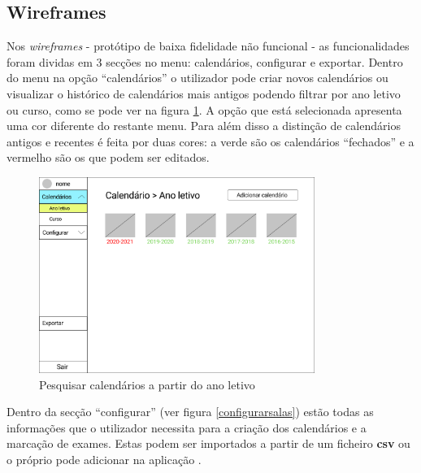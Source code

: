 \documentclass[11pt, twoside]{report}
\begin{document}
	\subsection{Wireframes}
	
	Nos \textit{wireframes} - protótipo de baixa fidelidade não funcional - as funcionalidades foram dividas em 3 secções no menu: calendários, configurar e exportar.
	Dentro do menu na opção ``calendários'' o utilizador pode criar novos calendários ou visualizar o histórico de calendários mais antigos podendo filtrar por ano letivo ou curso, como se pode ver na figura \ref{menucalendario}.
	A opção que está selecionada apresenta uma cor diferente do restante menu.
	Para além disso a distinção de calendários antigos e recentes é feita por duas cores: a verde são os calendários ``fechados'' e a vermelho são os que podem ser editados. 
	
	\begin{figure}[H] 
		\centering 
		\includegraphics[width=0.8\textwidth,height=0.8\textheight,keepaspectratio]{image/prototipowireframes/pesquisacalendarioanoletivo}
		\caption{Pesquisar calendários a partir do ano letivo}
		\label{menucalendario}
	\end{figure}
	
	Dentro da secção ``configurar'' (ver figura \ref{configurarsalas}) estão todas as informações que o utilizador necessita para a criação dos calendários e a marcação de exames. Estas podem ser importados a partir de um ficheiro \textbf{csv} ou o próprio pode adicionar na aplicação . 
	
\end{document}
